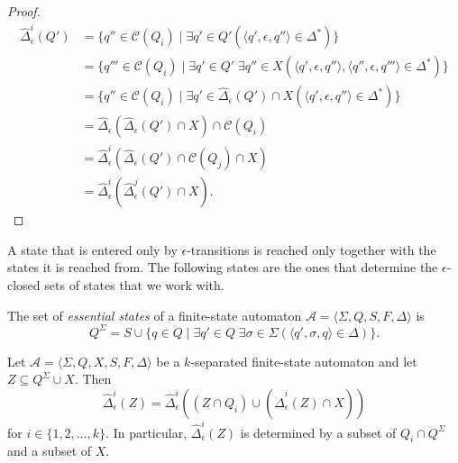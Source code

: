 \begin{proof}
  \begin{align*}
    \hat{\Delta}_\epsilon^i(Q')
    &= \{ q'' \in \mathcal{C}(Q_i) \mid \exists q' \in Q' (\langle q', \epsilon, q''
    \rangle \in \Delta^*) \}\\
    &= \{ q''' \in \mathcal{C}(Q_i) \mid \exists q' \in Q' \; \exists q'' \in X
    (\langle q', \epsilon, q'' \rangle, \langle q'', \epsilon, q''' \rangle \in
    \Delta^*) \}\\
    &= \{ q'' \in \mathcal{C}(Q_i) \mid \exists q' \in \hat{\Delta}_\epsilon(Q') \cap
    X (\langle q', \epsilon, q'' \rangle \in \Delta^*) \}\\
    &= \hat{\Delta}_\epsilon(\hat{\Delta}_\epsilon(Q') \cap X) \cap
    \mathcal{C}(Q_i)\\
    &= \hat{\Delta}_\epsilon^i(\hat{\Delta}_\epsilon(Q') \cap \mathcal{C}(Q_j) \cap
    X)\\
    &= \hat{\Delta}_\epsilon^i(\hat{\Delta}_\epsilon^j(Q') \cap X).
  \end{align*}
\end{proof}

A state that is entered only by $\epsilon$-transitions is reached only together with the
states it is reached from. The following states are the ones that determine the
$\epsilon$-closed sets of states that we work with.

\begin{definition}\label{def:essential_states}
  The set of \emph{essential states} of a finite-state automaton $\mathcal{A} =
  \langle \Sigma, Q, S, F, \Delta \rangle$ is
  \begin{equation*}
    Q^\Sigma = S \cup \{ q \in Q \mid \exists q' \in Q \; \exists \sigma \in \Sigma
    (\langle q', \sigma, q \rangle \in \Delta) \}.
  \end{equation*}
\end{definition}

\begin{proposition}\label{prop:essential_closure}
  Let $\mathcal{A} = \langle \Sigma, Q, X, S, F, \Delta \rangle$ be a $k$-separated
  finite-state automaton and let $Z \subseteq Q^\Sigma \cup X$. Then
  \begin{equation*}
    \hat{\Delta}_\epsilon^i(Z) = \hat{\Delta}_\epsilon^i((Z \cap Q_i) \cup
    (\hat{\Delta}_\epsilon^i(Z) \cap X))
  \end{equation*}
  for $i \in \{ 1, 2, \ldots, k \}$. In particular, $\hat{\Delta}_\epsilon^i(Z)$ is
  determined by a subset of $Q_i \cap Q^\Sigma$ and a subset of $X$.
\end{proposition}


